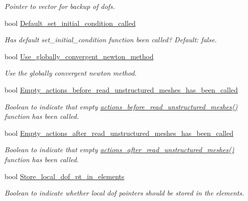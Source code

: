 \begin{DoxyCompactItemize}
\begin{DoxyCompactList}\small\item\em Pointer to vector for backup of dofs. \end{DoxyCompactList}\item 
bool \hyperlink{classoomph_1_1Problem_a83df3b5fcc3ebbae951021c8e7f03ef7}{Default\+\_\+set\+\_\+initial\+\_\+condition\+\_\+called}
\begin{DoxyCompactList}\small\item\em Has default set\+\_\+initial\+\_\+condition function been called? Default\+: false. \end{DoxyCompactList}\item 
bool \hyperlink{classoomph_1_1Problem_acf8b1ec937efdf2a0f892a41c18c0c53}{Use\+\_\+globally\+\_\+convergent\+\_\+newton\+\_\+method}
\begin{DoxyCompactList}\small\item\em Use the globally convergent newton method. \end{DoxyCompactList}\item 
bool \hyperlink{classoomph_1_1Problem_a5f13ea67c29022392857b5c19bb3af71}{Empty\+\_\+actions\+\_\+before\+\_\+read\+\_\+unstructured\+\_\+meshes\+\_\+has\+\_\+been\+\_\+called}
\begin{DoxyCompactList}\small\item\em Boolean to indicate that empty \hyperlink{classoomph_1_1Problem_af10662119a7a0c3a47879fa0d0644452}{actions\+\_\+before\+\_\+read\+\_\+unstructured\+\_\+meshes()} function has been called. \end{DoxyCompactList}\item 
bool \hyperlink{classoomph_1_1Problem_a71f87e46a571a54abd27a26f6c701c36}{Empty\+\_\+actions\+\_\+after\+\_\+read\+\_\+unstructured\+\_\+meshes\+\_\+has\+\_\+been\+\_\+called}
\begin{DoxyCompactList}\small\item\em Boolean to indicate that empty \hyperlink{classoomph_1_1Problem_a498317b3e390eddf2169ab989ee8d6b4}{actions\+\_\+after\+\_\+read\+\_\+unstructured\+\_\+meshes()} function has been called. \end{DoxyCompactList}\item 
bool \hyperlink{classoomph_1_1Problem_a075696d6f4c4260ce860997c8c931de4}{Store\+\_\+local\+\_\+dof\+\_\+pt\+\_\+in\+\_\+elements}
\begin{DoxyCompactList}\small\item\em Boolean to indicate whether local dof pointers should be stored in the elements. \end{DoxyCompactList}\item 

\end{DoxyCompactItemize}
